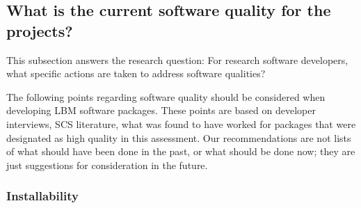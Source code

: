 \documentclass[final, 3p, times, authoryear]{elsarticle}
\begin{document}
\subsection{What is the current software quality for the projects?}
\label{qualityrecommentations}

This subsection answers the research question: For research software developers,
what specific actions are taken to address software qualities?

The following points regarding software quality should be considered when
developing LBM software packages. These points are based on developer
interviews, SCS literature, what was found to have worked for packages that were
designated as high quality in this assessment.  Our recommendations are not
lists of what should have been done in the past, or what should be done now;
they are just suggestions for consideration in the future.

\subsubsection{Installability}
\end{document}
